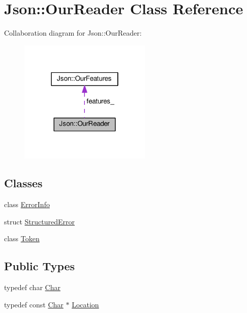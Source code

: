 \hypertarget{class_json_1_1_our_reader}{}\section{Json\+:\+:Our\+Reader Class Reference}
\label{class_json_1_1_our_reader}


Collaboration diagram for Json\+:\+:Our\+Reader\+:\nopagebreak
\begin{figure}[H]
\begin{center}
\leavevmode
\includegraphics[width=178pt]{class_json_1_1_our_reader__coll__graph}
\end{center}
\end{figure}
\subsection*{Classes}
\begin{DoxyCompactItemize}
\item 
class \hyperlink{class_json_1_1_our_reader_1_1_error_info}{Error\+Info}
\item 
struct \hyperlink{struct_json_1_1_our_reader_1_1_structured_error}{Structured\+Error}
\item 
class \hyperlink{class_json_1_1_our_reader_1_1_token}{Token}
\end{DoxyCompactItemize}
\subsection*{Public Types}
\begin{DoxyCompactItemize}
\item 
typedef char \hyperlink{class_json_1_1_our_reader_a0cd0bab4caa66594ab843ccd5f9dc239}{Char}
\item 
typedef const \hyperlink{class_json_1_1_our_reader_a0cd0bab4caa66594ab843ccd5f9dc239}{Char} $\ast$ \hyperlink{class_json_1_1_our_reader_a1bdc7bbc52ba87cae6b19746f2ee0189}{Location}
\end{DoxyCompactItemize}
